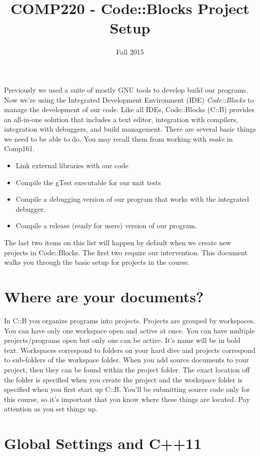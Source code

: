 \documentclass[10pt]{article}
\title{COMP220 - Code::Blocks Project Setup}
\author{ }
\date{Fall 2015}
\begin{document}
\maketitle

Previously we used a suite of mostly GNU tools to develop build our programs.  Now we're using the Integrated Development Environment (IDE) \textit{Code::Blocks} to manage the development of our code. Like all IDEs, Code::Blocks (C::B) provides an all-in-one solution that includes a text editor, integration with compilers, integration with debuggers, and build management. There are several basic things we need to be able to do.  You may recall them from working with \textit{make} in Comp161.
\begin{itemize}
\item Link external libraries with our code
\item Compile the gTest executable for our unit tests
\item Compile a debugging version of our program that works with the integrated debugger. 
\item Compile a release (ready for users) version of our program. 
\end{itemize}
The last two items on this list will happen by default when we create new projects in Code::Blocks. The first two require our intervention. This document walks you through the basic setup for projects in the course. 

\section{Where are your documents?}

In C::B you organize programs into projects. Projects are grouped by workspaces. You can have only one workspace open and active at once. You can have multiple projects/programs open but only one can be active. It's name will be in bold text. Workspaces correspond to folders on your hard dive and projects correspond to sub-folders of the workspace folder. When you add source documents to your project, then they can be found within the project folder. The exact location off the folder is specified when you create the project and the workspace folder is specified when you first start up C::B. You'll be submitting source code only for this course, so it's important that you know where these things are located. Pay attention as you set things up.

\section{Global Settings and C++11}
\end{document}
